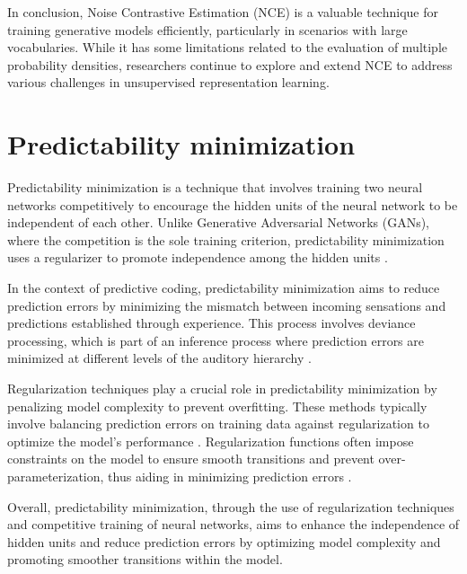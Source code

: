 In conclusion, Noise Contrastive Estimation (NCE) is a valuable technique for training generative models efficiently, particularly in scenarios with large vocabularies. While it has some limitations related to the evaluation of multiple probability densities, researchers continue to explore and extend NCE to address various challenges in unsupervised representation learning.


\section*{Predictability minimization}


Predictability minimization is a technique that involves training two neural networks competitively to encourage the hidden units of the neural network to be independent of each other. Unlike Generative Adversarial Networks (GANs), where the competition is the sole training criterion, predictability minimization uses a regularizer to promote independence among the hidden units \citep{10.1145/2640087.2644155}.

In the context of predictive coding, predictability minimization aims to reduce prediction errors by minimizing the mismatch between incoming sensations and predictions established through experience. This process involves deviance processing, which is part of an inference process where prediction errors are minimized at different levels of the auditory hierarchy \citep{10.3389/fnhum.2015.00505}.

Regularization techniques play a crucial role in predictability minimization by penalizing model complexity to prevent overfitting. These methods typically involve balancing prediction errors on training data against regularization to optimize the model's performance \citep{10.1186/1471-2105-16-s16-s2}. Regularization functions often impose constraints on the model to ensure smooth transitions and prevent over-parameterization, thus aiding in minimizing prediction errors \citep{10.1007/978-1-4615-5339-7_102}.

Overall, predictability minimization, through the use of regularization techniques and competitive training of neural networks, aims to enhance the independence of hidden units and reduce prediction errors by optimizing model complexity and promoting smoother transitions within the model.



